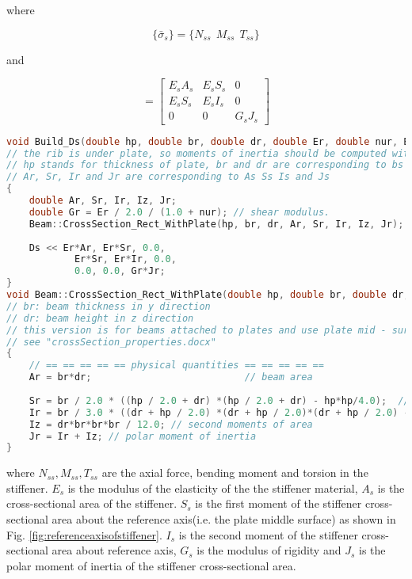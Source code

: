 where 

\begin{equation}
\{\bar{\sigma}_s\} = \{ N_{ss}~~M_{ss}~~T_{ss}\}
\end{equation}

and 

\begin{equation}
[D_s] = \begin{bmatrix}
E_s A_s & E_s S_s & 0 \\ 
E_s S_s & E_s I_s & 0 \\ 
0 & 0 & G_s J_s
\end{bmatrix} 
\end{equation}

\begin{lstlisting}[language=c++]
void Build_Ds(double hp, double br, double dr, double Er, double nur, Eigen::Matrix3d &Ds)
// the rib is under plate, so moments of inertia should be computed with offset.
// hp stands for thickness of plate, br and dr are corresponding to bs and ds in the document.
// Ar, Sr, Ir and Jr are corresponding to As Ss Is and Js
{
	double Ar, Sr, Ir, Iz, Jr;
	double Gr = Er / 2.0 / (1.0 + nur); // shear modulus.
	Beam::CrossSection_Rect_WithPlate(hp, br, dr, Ar, Sr, Ir, Iz, Jr);
	
	Ds << Er*Ar, Er*Sr, 0.0,
			Er*Sr, Er*Ir, 0.0,
			0.0, 0.0, Gr*Jr;
}
void Beam::CrossSection_Rect_WithPlate(double hp, double br, double dr, double &Ar, double &Sr, double &Ir, double &Iz, double &Jr)
// br: beam thickness in y direction
// dr: beam height in z direction
// this version is for beams attached to plates and use plate mid - surface as reference.
// see "crossSection_properties.docx"
{
	// == == == == == physical quantities == == == == ==
	Ar = br*dr;                           // beam area
	
	Sr = br / 2.0 * ((hp / 2.0 + dr) *(hp / 2.0 + dr) - hp*hp/4.0);  // first moment
	Ir = br / 3.0 * ((dr + hp / 2.0) *(dr + hp / 2.0)*(dr + hp / 2.0) - hp*hp*hp/8.0); // second moments of area, is Iy actually
	Iz = dr*br*br*br / 12.0; // second moments of area
	Jr = Ir + Iz; // polar moment of inertia
}
\end{lstlisting}

where $ N_{ss}, M_{ss}, T_{ss} $ are the axial force, bending moment and torsion in the stiffener. $ E_s $ is the modulus of the elasticity of the the stiffener material, $ A_s $ is the cross-sectional area of the stiffener. $ S_s $ is the first moment of the stiffener cross-sectional area about the reference axis(i.e. the plate middle surface) as shown in Fig. \ref{fig:referenceaxisofstiffener}. $ I_s $ is the second moment of the stiffener cross-sectional area about reference axis, $ G_s $ is the modulus of rigidity and $ J_s $ is the polar moment of inertia of the stiffener cross-sectional area.

